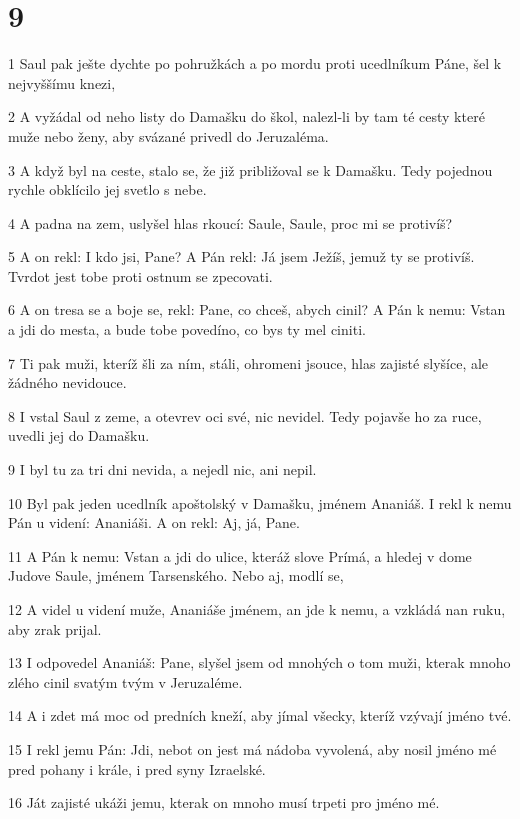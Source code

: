 \chapter{9}

\par 1 Saul pak ješte dychte po pohružkách a po mordu proti ucedlníkum Páne, šel k nejvyššímu knezi,
\par 2 A vyžádal od neho listy do Damašku do škol, nalezl-li by tam té cesty které muže nebo ženy, aby svázané privedl do Jeruzaléma.
\par 3 A když byl na ceste, stalo se, že již približoval se k Damašku. Tedy pojednou rychle obklícilo jej svetlo s nebe.
\par 4 A padna na zem, uslyšel hlas rkoucí: Saule, Saule, proc mi se protivíš?
\par 5 A on rekl: I kdo jsi, Pane? A Pán rekl: Já jsem Ježíš, jemuž ty se protivíš. Tvrdot jest tobe proti ostnum se zpecovati.
\par 6 A on tresa se a boje se, rekl: Pane, co chceš, abych cinil? A Pán k nemu: Vstan a jdi do mesta, a bude tobe povedíno, co bys ty mel ciniti.
\par 7 Ti pak muži, kteríž šli za ním, stáli, ohromeni jsouce, hlas zajisté slyšíce, ale žádného nevidouce.
\par 8 I vstal Saul z zeme, a otevrev oci své, nic nevidel. Tedy pojavše ho za ruce, uvedli jej do Damašku.
\par 9 I byl tu za tri dni nevida, a nejedl nic, ani nepil.
\par 10 Byl pak jeden ucedlník apoštolský v Damašku, jménem Ananiáš. I rekl k nemu Pán u videní: Ananiáši. A on rekl: Aj, já, Pane.
\par 11 A Pán k nemu: Vstan a jdi do ulice, kteráž slove Prímá, a hledej v dome Judove Saule, jménem Tarsenského. Nebo aj, modlí se,
\par 12 A videl u videní muže, Ananiáše jménem, an jde k nemu, a vzkládá nan ruku, aby zrak prijal.
\par 13 I odpovedel Ananiáš: Pane, slyšel jsem od mnohých o tom muži, kterak mnoho zlého cinil svatým tvým v Jeruzaléme.
\par 14 A i zdet má moc od predních kneží, aby jímal všecky, kteríž vzývají jméno tvé.
\par 15 I rekl jemu Pán: Jdi, nebot on jest má nádoba vyvolená, aby nosil jméno mé pred pohany i krále, i pred syny Izraelské.
\par 16 Ját zajisté ukáži jemu, kterak on mnoho musí trpeti pro jméno mé.
